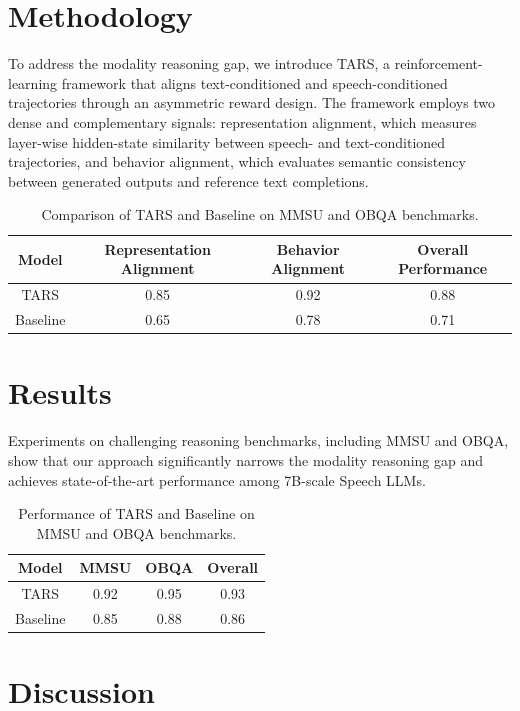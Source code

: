 \documentclass{article}
\begin{document}
\section{Methodology}

To address the modality reasoning gap, we introduce TARS, a reinforcement-learning framework that aligns text-conditioned and speech-conditioned trajectories through an asymmetric reward design. The framework employs two dense and complementary signals: representation alignment, which measures layer-wise hidden-state similarity between speech- and text-conditioned trajectories, and behavior alignment, which evaluates semantic consistency between generated outputs and reference text completions.

\begin{table}[h]
\centering
\begin{tabular}{|c|c|c|c|}
\hline
\textbf{Model} & \textbf{Representation Alignment} & \textbf{Behavior Alignment} & \textbf{Overall Performance} \\
\hline
TARS & 0.85 & 0.92 & 0.88 \\
\hline
Baseline & 0.65 & 0.78 & 0.71 \\
\hline
\end{tabular}
\caption{Comparison of TARS and Baseline on MMSU and OBQA benchmarks.}
\end{table}

\section{Results}

Experiments on challenging reasoning benchmarks, including MMSU and OBQA, show that our approach significantly narrows the modality reasoning gap and achieves state-of-the-art performance among 7B-scale Speech LLMs.

\begin{table}[h]
\centering
\begin{tabular}{|c|c|c|c|}
\hline
\textbf{Model} & \textbf{MMSU} & \textbf{OBQA} & \textbf{Overall} \\
\hline
TARS & 0.92 & 0.95 & 0.93 \\
\hline
Baseline & 0.85 & 0.88 & 0.86 \\
\hline
\end{tabular}
\caption{Performance of TARS and Baseline on MMSU and OBQA benchmarks.}
\end{table}

\section{Discussion}
\end{document}
